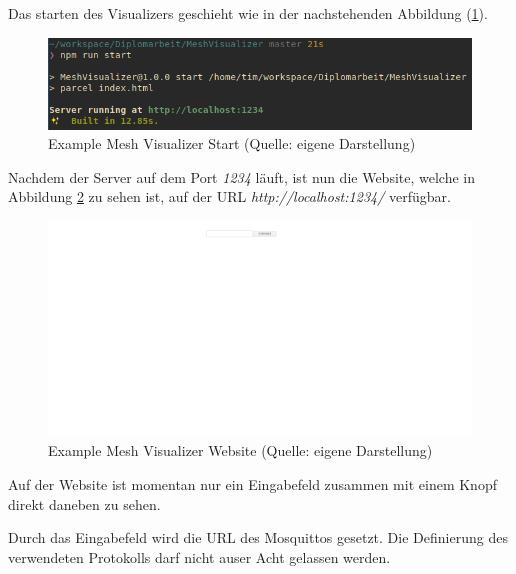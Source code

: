 Das starten des Visualizers geschieht wie in der nachstehenden Abbildung (\ref{abb:example_mesh_visualizer_start}).

\begin{figure}[H]
    \begin{center}
        \includegraphics[scale=.6]{images/example_mesh_visualizer_start.png}
        \caption{Example Mesh Visualizer Start (Quelle: eigene Darstellung)}
        \label{abb:example_mesh_visualizer_start}
    \end{center}
\end{figure}

Nachdem der Server auf dem Port \textit{1234} läuft, ist nun die Website, welche in Abbildung \ref{abb:example_mesh_visualizer_website} zu sehen ist, auf der URL \textit{http://localhost:1234/} verfügbar.

\begin{figure}[H]
    \begin{center}
        \includegraphics[scale=.3]{images/example_mesh_visualizer_website.png}
        \caption{Example Mesh Visualizer Website (Quelle: eigene Darstellung)}
        \label{abb:example_mesh_visualizer_website}
    \end{center}
\end{figure}

Auf der Website ist momentan nur ein Eingabefeld zusammen mit einem Knopf direkt daneben zu sehen.

Durch das Eingabefeld wird die URL des Mosquittos gesetzt. 
Die Definierung des verwendeten Protokolls darf nicht auser Acht gelassen werden.\newline

